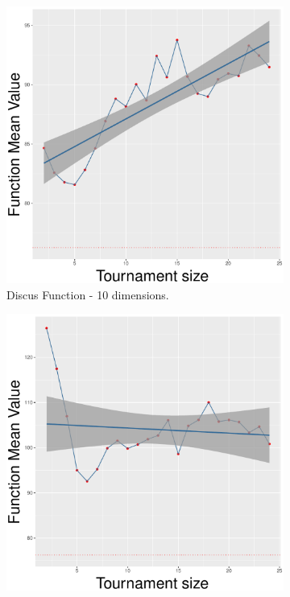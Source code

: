 \begin{figure}[!t]
	\begin{subfigure}[b]{0.33\textwidth}
		\centering
		\includegraphics[width=\textwidth]{img/SBX-10D/unimodal_sbx_11_dim_10.pdf}
		\caption{Discus Function - 10 dimensions.}
	\end{subfigure}
	\begin{subfigure}[b]{0.33\textwidth}
		\centering
		\includegraphics[width=\textwidth]{img/SBX-20D/unimodal_sbx_11_dim_20.pdf}

\end{subfigure}
\end{figure}
